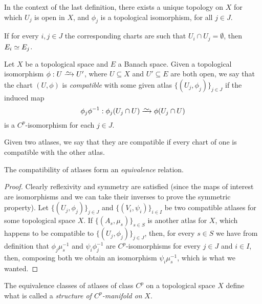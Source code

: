 \begin{proposition}
\label{prop:unique-topology-charts}
In the context of the last definition, there exists a unique topology on \(X\)
for which \(U_j\) is open in \(X\), and \(\phi_j\) is a topological isomorphism,
for all \(j \in J\).
\end{proposition}

\begin{proposition}
If for every \(i, j \in J\) the corresponding charts are such that \(U_i \cap
U_j = \emptyset\), then \(E_i \simeq E_j\).
\end{proposition}

\begin{definition}
\label{def:compatible-chart}
Let \(X\) be a topological space and \(E\) a Banach space. Given a topological
isomorphism \(\phi: U \isoto U'\), where \(U \subseteq X\) and \(U' \subseteq
E\) are both open, we say that the chart \((U, \phi)\) is \emph{compatible} with
some given atlas \(\{(U_{j}, \phi_j)\}_{j \in J}\) if the induced map
\[
  \phi_j \phi^{-1}: \phi_j(U_j \cap U) \isoto \phi(U_j \cap U)
\]
is a \(C^p\)-isomorphism for each \(j \in J\).

Given two atlases, we say that they are compatible if every chart of one is
compatible with the other atlas.
\end{definition}

\begin{proposition}
\label{prop:compatible-atlas-equivalence-relation}
The compatibility of atlases form an \emph{equivalence} relation.
\end{proposition}

\begin{proof}
Clearly reflexivity and symmetry are satisfied (since the maps of interest
are isomorphisms and we can take their inverses to prove the symmetric
property). Let \(\{(U_{j}, \phi_j)\}_{j \in J}\) and \(\{(V_{i}, \psi_i)\}_{i
  \in I}\) be two compatible atlases for some topological space \(X\). If
\(\{(A_{s}, \mu_s)\}_{s \in S}\) is another atlas for \(X\), which happens to be
compatible to \(\{(U_{j}, \phi_j)\}_{j \in J}\), then, for every \(s \in S\) we
have from definition that \(\phi_j \mu_{s}^{-1}\) and \(\psi_i \phi_j^{-1}\) are
\(C^p\)-isomorphisms for every \(j \in J\) and \(i \in I\), then, composing both
we obtain an isomorphism \(\psi_i \mu_s^{-1}\), which is what we wanted.
\end{proof}

\begin{definition}
\label{def:Cp-manifold}
The equivalence classes of atlases of class \(C^p\) on a topological space \(X\)
define what is called a \emph{structure of \(C^p\)-manifold on} \(X\).
\end{definition}

